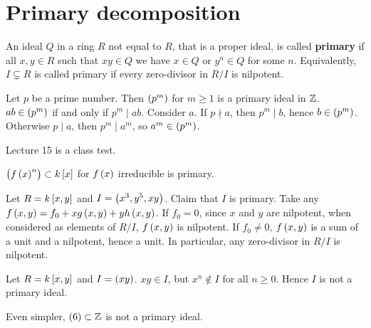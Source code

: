 \pagebreak

\section{Primary decomposition}

\begin{definition}
An ideal $ Q $ in a ring $ R $ not equal to $ R $, that is a proper ideal, is called \textbf{primary} if all $ x, y \in R $ such that $ xy \in Q $ we have $ x \in Q $ or $ y^n \in Q $ for some $ n $. Equivalently, $ I \subsetneq R $ is called primary if every zero-divisor in $ R / I $ is nilpotent.
\end{definition}

\begin{example*}
Let $ p $ be a prime number. Then $ \br{p^m} $ for $ m \ge 1 $ is a primary ideal in $ \mathbb{Z} $. $ ab \in \br{p^m} $ if and only if $ p^m \mid ab $. Consider $ a $. If $ p \nmid a $, then $ p^m \mid b $, hence $ b \in \br{p^m} $. Otherwise $ p \mid a $, then $ p^m \mid a^m $, so $ a^m \in \br{p^m} $.
\end{example*}


Lecture 15 is a class test.


\begin{example*}
$ \br{f\br{x}^n} \subset k\sbr{x} $ for $ f\br{x} $ irreducible is primary.
\end{example*}

\begin{example*}
Let $ R = k\sbr{x, y} $ and $ I = \br{x^3, y^5, xy} $. Claim that $ I $ is primary. Take any $ f\br{x, y} = f_0 + xg\br{x, y} + yh\br{x, y} $. If $ f_0 = 0 $, since $ x $ and $ y $ are nilpotent, when considered as elements of $ R / I $, $ f\br{x, y} $ is nilpotent. If $ f_0 \ne 0 $, $ f\br{x, y} $ is a sum of a unit and a nilpotent, hence a unit. In particular, any zero-divisor in $ R / I $ is nilpotent.
\end{example*}

\begin{example*}
Let $ R = k\sbr{x, y} $ and $ I = \br{xy} $. $ xy \in I $, but $ x^n \notin I $ for all $ n \ge 0 $. Hence $ I $ is not a primary ideal.
\end{example*}

\begin{example*}
Even simpler, $ \br{6} \subset \Z $ is not a primary ideal.
\end{example*}

